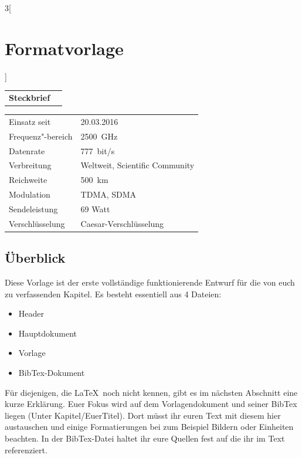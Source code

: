 \begin{multicols}{3}[\section{Formatvorlage}]


\newrefsegment

\begin{tabular}{p{}p{2.7 cm}}
\textbf{Steckbrief}& \\
\end{tabular}
\begin{tabular}{p{}p{2.7 cm}}
      Einsatz seit & 20.03.2016\\
      Frequenz"-bereich  & \SI{2500}{\giga\hertz}\\
      Datenrate & \SI{777}{bit/s}\\
      Verbreitung & Weltweit, Scientific Community\\
      Reichweite & \SI{500}{\kilo\metre}\\
      Modulation & TDMA, SDMA\\
      Sendeleistung & 69 Watt\\
      Verschlüsselung & Caesar-Verschlüsselung\\
\end{tabular}
\par
\subsection*{Überblick}
Diese Vorlage ist der erste vollständige funktionierende Entwurf für die von euch zu verfassenden Kapitel. Es besteht essentiell aus 4 Dateien:
\begin{itemize}
	\item Header
	\item Hauptdokument
	\item Vorlage
	\item BibTex-Dokument
\end{itemize}

Für diejenigen, die \LaTeX~noch nicht kennen, gibt es im nächsten Abschnitt eine kurze Erklärung. Euer Fokus wird auf dem Vorlagendokument und seiner BibTex liegen (Unter Kapitel/EuerTitel). Dort müsst ihr euren Text mit diesem hier austauschen und einige Formatierungen bei zum Beispiel Bildern oder Einheiten beachten. In der BibTex-Datei haltet ihr eure Quellen fest auf die ihr im Text referenziert. 


\end{multicols}
